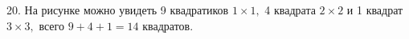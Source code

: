 20. На рисунке можно увидеть 9 квадратиков $1\times1,$ 4 квадрата $2\times2$ и 1 квадрат $3\times3,$ всего $9+4+1=14$ квадратов.\\
